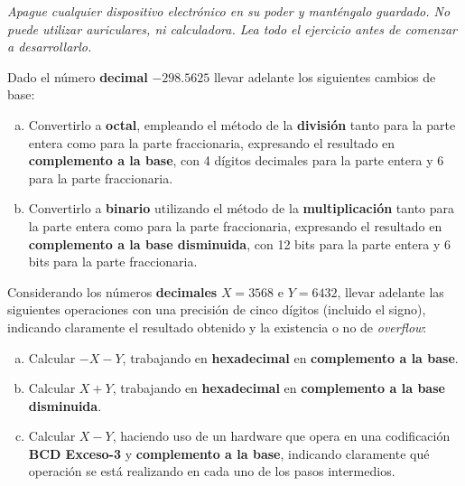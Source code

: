 \documentclass[12pt,a4paper]{article}
\begin{document}

\begin{center}
	\emph{Apague cualquier dispositivo electrónico en su poder y manténgalo guardado. No puede utilizar auriculares, ni calculadora. Lea todo el ejercicio antes de comenzar a desarrollarlo.}
\end{center}

Dado el número \textbf{decimal} $-298.5625$ llevar adelante los siguientes cambios de base:
\begin{enumerate}[a)]
	\item Convertirlo a \textbf{octal}, empleando el método de la \textbf{división} tanto para la parte entera como para la parte fraccionaria, expresando el resultado en \textbf{complemento a la base}, con 4 dígitos decimales para la parte entera y 6 para la parte fraccionaria.

	\item Convertirlo a \textbf{binario} utilizando el método de la \textbf{multiplicación} tanto para la parte entera como para la parte fraccionaria, expresando el resultado en \textbf{complemento a la base disminuida}, con 12 bits para la parte entera y 6 bits para la parte fraccionaria.
\end{enumerate}

Considerando los números {\textbf{decimales}} $X = 3568$ e $Y = 6432$, llevar adelante las siguientes operaciones con una precisión de cinco dígitos (incluido el signo), indicando claramente el resultado obtenido y la existencia o no de \emph{overflow}:
\begin{enumerate}[a)]
	\item Calcular $- X - Y$, trabajando en \textbf{hexadecimal} en \textbf{complemento a la base}.
	\item Calcular $ X + Y $, trabajando en \textbf{hexadecimal} en \textbf{complemento a la base disminuida}.
	\item Calcular $X - Y$, haciendo uso de un hardware que opera en una codificación \textbf{BCD Exceso-3} y \textbf{complemento a la base}, indicando claramente qué operación se está realizando en cada uno de los pasos intermedios.
\end{enumerate}
\end{document}
